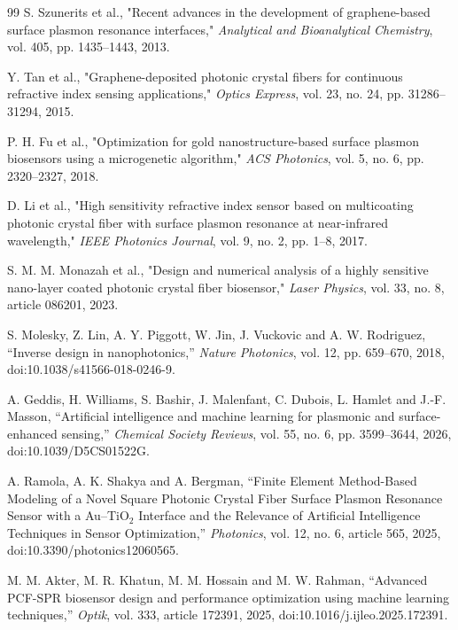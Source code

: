 \documentclass[5p,times,twocolumn]{elsarticle}
\begin{document}
\begin{thebibliography}{99}
 S. Szunerits et al., "Recent advances in the development of graphene-based surface plasmon resonance interfaces," \textit{Analytical and Bioanalytical Chemistry}, vol. 405, pp. 1435--1443, 2013.

 Y. Tan et al., "Graphene-deposited photonic crystal fibers for continuous refractive index sensing applications," \textit{Optics Express}, vol. 23, no. 24, pp. 31286--31294, 2015.

 P. H. Fu et al., "Optimization for gold nanostructure-based surface plasmon biosensors using a microgenetic algorithm," \textit{ACS Photonics}, vol. 5, no. 6, pp. 2320--2327, 2018.

 D. Li et al., "High sensitivity refractive index sensor based on multicoating photonic crystal fiber with surface plasmon resonance at near-infrared wavelength," \textit{IEEE Photonics Journal}, vol. 9, no. 2, pp. 1--8, 2017.

 S. M. M. Monazah et al., "Design and numerical analysis of a highly sensitive nano-layer coated photonic crystal fiber biosensor," \textit{Laser Physics}, vol. 33, no. 8, article 086201, 2023.

 S. Molesky, Z. Lin, A. Y. Piggott, W. Jin, J. Vuckovic and A. W. Rodriguez, ``Inverse design in nanophotonics,'' \textit{Nature Photonics}, vol. 12, pp. 659--670, 2018, doi:10.1038/s41566-018-0246-9.

 A. Geddis, H. Williams, S. Bashir, J. Malenfant, C. Dubois, L. Hamlet and J.-F. Masson, ``Artificial intelligence and machine learning for plasmonic and surface-enhanced sensing,'' \textit{Chemical Society Reviews}, vol. 55, no. 6, pp. 3599--3644, 2026, doi:10.1039/D5CS01522G.

 A. Ramola, A. K. Shakya and A. Bergman, ``Finite Element Method-Based Modeling of a Novel Square Photonic Crystal Fiber Surface Plasmon Resonance Sensor with a Au--TiO$_2$ Interface and the Relevance of Artificial Intelligence Techniques in Sensor Optimization,'' \textit{Photonics}, vol. 12, no. 6, article 565, 2025, doi:10.3390/photonics12060565.

 M. M. Akter, M. R. Khatun, M. M. Hossain and M. W. Rahman, ``Advanced PCF-SPR biosensor design and performance optimization using machine learning techniques,'' \textit{Optik}, vol. 333, article 172391, 2025, doi:10.1016/j.ijleo.2025.172391.


\end{thebibliography}
\end{document}
